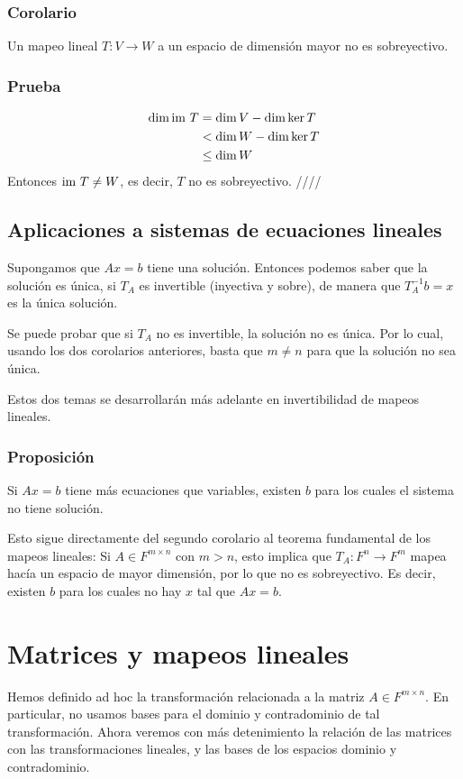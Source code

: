 \documentclass{article}
\begin{document}
\subsubsection{Corolario}
Un mapeo lineal $T: V\rightarrow W$ a un espacio de dimensión mayor
no es sobreyectivo.

\subsubsection*{Prueba}
\begin{align*}
    \dim\text{im } T &= \dim V - \dim\ker T\\
    &< \dim W - \dim\ker T \\
    &\leq \dim W
\end{align*}
Entonces $\text{im } T \neq W$, es decir, $T$ no es sobreyectivo.
\hfill ////

\subsection{Aplicaciones a sistemas de ecuaciones lineales}
Supongamos que $Ax=b$ tiene una solución. Entonces podemos saber
que la solución es única, si $T_A$ es invertible (inyectiva y sobre), de manera que $T_A^{-1}b = x$ es la única solución.

Se puede probar que si $T_A$ no es invertible, la solución no es única. Por lo cual, usando los dos corolarios anteriores, basta que $m\neq n$ para que la solución no sea única. 

Estos dos temas se desarrollarán más adelante en invertibilidad de mapeos lineales.

\subsubsection{Proposición}
Si $Ax=b$ tiene más ecuaciones que variables, existen $b$ para
los cuales el sistema no tiene solución.

Esto sigue directamente del segundo corolario al teorema fundamental de los mapeos lineales: Si $A\in F^{m\times n}$ con $m>n$, esto implica que $T_A: F^n\rightarrow F^m$ mapea hacía un espacio de mayor dimensión, por lo que no es sobreyectivo. Es decir, existen $b$ para
los cuales no hay $x$ tal que $Ax=b$.
\newpage

\section{Matrices y mapeos lineales}
Hemos definido ad hoc la transformación relacionada a la matriz $A\in F^{m\times n}$.
En particular, no usamos bases para el dominio y contradominio de tal transformación.
Ahora veremos con más detenimiento la relación de las matrices con las transformaciones lineales,
y las bases de los espacios dominio y contradominio.
\end{document}
